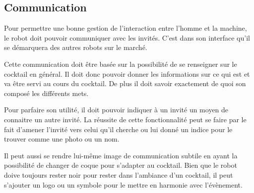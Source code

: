 
\subsection{Communication}
 
Pour permettre une bonne gestion de l’interaction entre l’homme et la machine, le robot doit pouvoir communiquer avec les invités. C’est dans son interface qu’il se démarquera des autres robots sur le marché.

Cette communication doit être basée sur la possibilité de se renseigner sur le cocktail en général. Il doit donc pouvoir donner les informations sur ce qui est et va être servi au cours du cocktail. De plus il doit savoir exactement de quoi son composé les différents mets.

Pour parfaire son utilité, il doit pouvoir indiquer à un invité un moyen de connaitre un autre invité. La réussite de cette fonctionnalité peut se faire par le fait d’amener l’invité vers celui qu’il cherche ou lui donné un indice pour le trouver comme une photo ou un nom.

Il peut aussi se rendre lui-même image de communication subtile en ayant la possibilité de changer de coque pour s’adapter au cocktail. Bien que le robot doive toujours rester noir pour rester dans l’ambiance d’un cocktail, il peut s’ajouter un logo ou un symbole pour le mettre en harmonie avec l’évènement.

